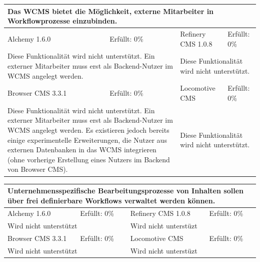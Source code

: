 \newline
\newline
\newline
\begin{tabular}[!ht]{|l|l|l|l|}
\hline
\multicolumn{4}{|p{15cm}|}{\textbf{Das WCMS bietet die Möglichkeit, externe Mitarbeiter in Workflowprozesse einzubinden.}} \\
\hline
  Alchemy 1.6.0 & \cellcolor{red}Erfüllt: 0\% & Refinery CMS 1.0.8 & \cellcolor{red}Erfüllt: 0\% \\
  \hline
  \multicolumn{2}{|p{7.5cm}|}{Diese Funktionalität wird nicht unterstützt. Ein externer Mitarbeiter muss erst als Backend-Nutzer im WCMS angelegt werden.} & \multicolumn{2}{p{7.5cm}|}{Diese Funktionalität wird nicht unterstützt.} \\
  \hline
  Browser CMS 3.3.1 & \cellcolor{red}Erfüllt: 0\% & Locomotive CMS & \cellcolor{red}Erfüllt: 0\% \\
  \hline
  \multicolumn{2}{|p{7.5cm}|}{Diese Funktionalität wird nicht unterstützt. Ein externer Mitarbeiter muss erst als Backend-Nutzer im WCMS angelegt werden. Es existieren jedoch bereits einige experimentelle Erweiterungen, die Nutzer aus externen Datenbanken in das WCMS integrieren (ohne vorherige Erstellung eines Nutzers im Backend von Browser CMS).} & \multicolumn{2}{p{7.5cm}|}{Diese Funktionalität wird nicht unterstützt.} \\
\hline
\end{tabular}
\newline
\newline
\newline
\begin{tabular}[!ht]{|l|l|l|l|}
\hline
\multicolumn{4}{|p{15cm}|}{\textbf{Unternehmensspezifische Bearbeitungsprozesse von Inhalten sollen über frei definierbare Workflows verwaltet werden können.}} \\
\hline
  Alchemy 1.6.0 & \cellcolor{red}Erfüllt: 0\% & Refinery CMS 1.0.8 & \cellcolor{red}Erfüllt: 0\% \\
  \hline
  \multicolumn{2}{|p{7.5cm}|}{Wird nicht unterstützt} & \multicolumn{2}{p{7.5cm}|}{Wird nicht unterstüzt} \\
  \hline
  Browser CMS 3.3.1 & \cellcolor{red}Erfüllt: 0\% & Locomotive CMS & \cellcolor{red}Erfüllt: 0\% \\
  \hline
  \multicolumn{2}{|p{7.5cm}|}{Wird nicht unterstützt} & \multicolumn{2}{p{7.5cm}|}{Wird nicht unterstüzt} \\
\hline
\end{tabular}
\newline
\newline
\newline
